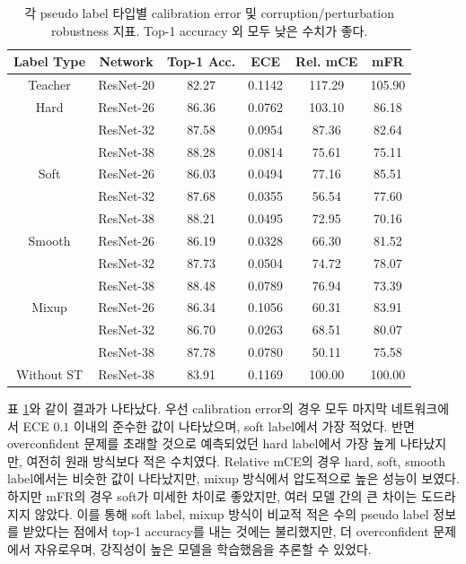 \begin{table}[!h]
  \center
  \begin{tabular}{ |c|c|c|c|c|c| }
    \hline
      Label Type & Network & Top-1 Acc. & ECE & Rel. mCE & mFR \\ \hline
      Teacher & ResNet-20 & 82.27 & 0.1142 & 117.29 & 105.90 \\ \hline
      Hard & ResNet-26 & 86.36 & 0.0762 & 103.10 & 86.18 \\ 
       & ResNet-32 & 87.58 & 0.0954 & 87.36 & 82.64 \\ 
       & ResNet-38 & 88.28 & 0.0814 & 75.61 & 75.11 \\ \hline
      Soft & ResNet-26 & 86.03 & 0.0494 & 77.16 & 85.51 \\
       & ResNet-32 & 87.68 & 0.0355 & 56.54 & 77.60 \\ 
       & ResNet-38 & 88.21 & 0.0495 & 72.95 & 70.16 \\ \hline
      Smooth & ResNet-26 & 86.19 & 0.0328 & 66.30 & 81.52 \\
       & ResNet-32 & 87.73 & 0.0504 & 74.72 & 78.07 \\ 
       & ResNet-38 & 88.48 & 0.0789 & 76.94 & 73.39 \\ \hline
      Mixup & ResNet-26 & 86.34 & 0.1056 & 60.31 & 83.91 \\
       & ResNet-32 & 86.70 & 0.0263 & 68.51 & 80.07 \\ 
       & ResNet-38 & 87.78 & 0.0780 & 50.11 & 75.58 \\ \hline
      Without ST & ResNet-38 & 83.91 & 0.1169 & 100.00 & 100.00 \\ \hline
  \end{tabular}    
  \caption{각 pseudo label 타입별 calibration error 및 corruption/perturbation robustness 지표. Top-1 accuracy 외 모두 낮은 수치가 좋다.}
  \label{robustness}
\end{table}

표 \ref{robustness}와 같이 결과가 나타났다. 우선 calibration error의 경우 모두 마지막 네트워크에서 ECE $0.1$ 이내의 준수한 값이 나타났으며, soft label에서 가장 적었다. 반면 overconfident 문제를 초래할 것으로 예측되었던 hard label에서 가장 높게 나타났지만, 여전히 원래 방식보다 적은 수치였다. Relative mCE의 경우 hard, soft, smooth label에서는 비슷한 값이 나타났지만, mixup 방식에서 압도적으로 높은 성능이 보였다. 하지만 mFR의 경우 soft가 미세한 차이로 좋았지만, 여러 모델 간의 큰 차이는 도드라지지 않았다. 이를 통해 soft label, mixup 방식이 비교적 적은 수의 pseudo label 정보를 받았다는 점에서 top-1 accuracy를 내는 것에는 불리했지만, 더 overconfident 문제에서 자유로우며, 강직성이 높은 모델을 학습했음을 추론할 수 있었다.